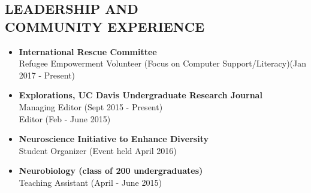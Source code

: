 \documentclass[line,margin,10pt]{res}
\begin{document}
\begin{resume}
 \section{LEADERSHIP AND\\ COMMUNITY EXPERIENCE}
 \begin{itemize}[leftmargin=-2pt]\itemsep -2pt
 \item[]\textbf{International Rescue Committee}\\Refugee Empowerment Volunteer (Focus on Computer Support/Literacy)\hfill (Jan 2017 - Present)
 \item[] \textbf{Explorations, UC Davis Undergraduate Research Journal} 
 \\ Managing Editor \hfill (Sept 2015 - Present)
 \\Editor \hfill(Feb - June 2015)

\item[] \textbf{Neuroscience Initiative to Enhance Diversity} \\ Student Organizer \hfill (Event held April 2016)
\item[] \textbf {Neurobiology (class of 200 undergraduates)} \\Teaching Assistant \hfill (April - June 2015)







\end{itemize}
\end{resume}
\end{document}
